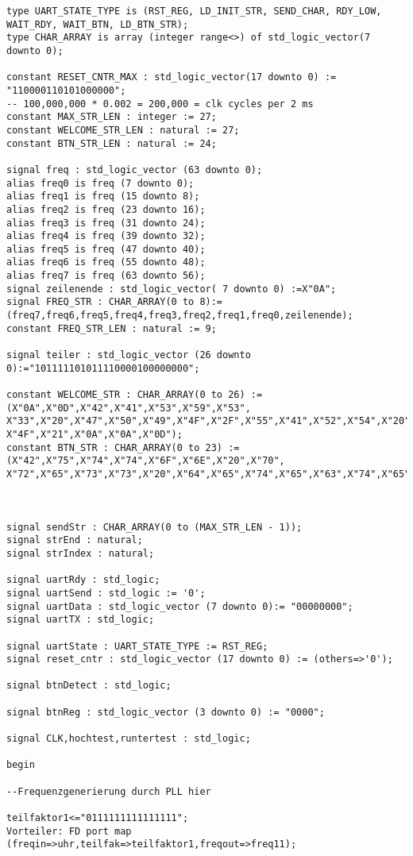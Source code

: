 \documentclass{article}
\begin{document}
\begin{verbatim}
type UART_STATE_TYPE is (RST_REG, LD_INIT_STR, SEND_CHAR, RDY_LOW, WAIT_RDY, WAIT_BTN, LD_BTN_STR);
type CHAR_ARRAY is array (integer range<>) of std_logic_vector(7 downto 0);

constant RESET_CNTR_MAX : std_logic_vector(17 downto 0) := "110000110101000000";
-- 100,000,000 * 0.002 = 200,000 = clk cycles per 2 ms
constant MAX_STR_LEN : integer := 27;
constant WELCOME_STR_LEN : natural := 27;
constant BTN_STR_LEN : natural := 24;

signal freq : std_logic_vector (63 downto 0);
alias freq0 is freq (7 downto 0);
alias freq1 is freq (15 downto 8);
alias freq2 is freq (23 downto 16);
alias freq3 is freq (31 downto 24);
alias freq4 is freq (39 downto 32);
alias freq5 is freq (47 downto 40);
alias freq6 is freq (55 downto 48);
alias freq7 is freq (63 downto 56);
signal zeilenende : std_logic_vector( 7 downto 0) :=X"0A";
signal FREQ_STR : CHAR_ARRAY(0 to 8):=(freq7,freq6,freq5,freq4,freq3,freq2,freq1,freq0,zeilenende);
constant FREQ_STR_LEN : natural := 9;

signal teiler : std_logic_vector (26 downto 0):="101111101011110000100000000";

constant WELCOME_STR : CHAR_ARRAY(0 to 26) := (X"0A",X"0D",X"42",X"41",X"53",X"59",X"53",
X"33",X"20",X"47",X"50",X"49",X"4F",X"2F",X"55",X"41",X"52",X"54",X"20",X"44",X"45",X"4D",
X"4F",X"21",X"0A",X"0A",X"0D");
constant BTN_STR : CHAR_ARRAY(0 to 23) := (X"42",X"75",X"74",X"74",X"6F",X"6E",X"20",X"70",
X"72",X"65",X"73",X"73",X"20",X"64",X"65",X"74",X"65",X"63",X"74",X"65",X"64",X"21",X"0A",X"0D");



signal sendStr : CHAR_ARRAY(0 to (MAX_STR_LEN - 1));
signal strEnd : natural;
signal strIndex : natural;

signal uartRdy : std_logic;
signal uartSend : std_logic := '0';
signal uartData : std_logic_vector (7 downto 0):= "00000000";
signal uartTX : std_logic;

signal uartState : UART_STATE_TYPE := RST_REG;
signal reset_cntr : std_logic_vector (17 downto 0) := (others=>'0');

signal btnDetect : std_logic;

signal btnReg : std_logic_vector (3 downto 0) := "0000";

signal CLK,hochtest,runtertest : std_logic;

begin

--Frequenzgenerierung durch PLL hier

teilfaktor1<="0111111111111111";
Vorteiler: FD port map (freqin=>uhr,teilfak=>teilfaktor1,freqout=>freq11);


\end{verbatim}
\end{document}
